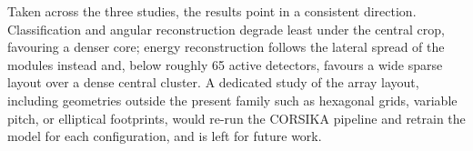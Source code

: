 Taken across the three studies, the results point in a consistent direction. Classification and angular reconstruction degrade least under the central crop, favouring a denser core; energy reconstruction follows the lateral spread of the modules instead and, below roughly 65 active detectors, favours a wide sparse layout over a dense central cluster. A dedicated study of the array layout, including geometries outside the present family such as hexagonal grids, variable pitch, or elliptical footprints, would re-run the CORSIKA pipeline and retrain the model for each configuration, and is left for future work.